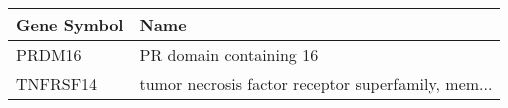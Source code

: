 \begin{tabular}{ll}
\toprule
Gene Symbol &                                               Name \\
\midrule
     PRDM16 &                            PR domain containing 16 \\
   TNFRSF14 & tumor necrosis factor receptor superfamily, mem... \\
\bottomrule
\end{tabular}
